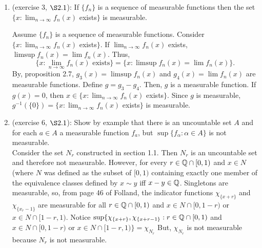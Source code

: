 \begin{enumerate}
\item (exercise 3, $\S 2.1$): If $\{f_n\}$ is a sequence of measurable functions then the set $\{x : \lim_{n \rightarrow \infty} f_n(x) $ exists$\}$ is measurable.
 \begin{pf}
Assume $\{f_n\}$ is a sequence of measurable functions. Consider $\{x : \lim_{n \rightarrow \infty} f_n(x) $ exists$\}$. If $\lim_{n \rightarrow \infty} f_n(x) $ exists, $\limsup f_n(x)=\lim f_n(x)$. Thus, \[
\{x : \lim_{n \rightarrow \infty} f_n(x) \text{ exists}\}= \{x : \limsup f_n(x)=\lim f_n(x)\}.
\]
By, proposition 2.7, $g_3(x)=\limsup f_n(x)$ and $g_4(x)=\lim f_n(x)$ are measurable functions. Define $g= g_3 - g_4$. Then, $g$ is a measurable function. If $g(x)=0$, then $x \in \{x : \lim_{n \rightarrow \infty} f_n(x) $ exists$\}$. Since $g$ is measurable, $g^{-1}(\{0\})=\{x : \lim_{n \rightarrow \infty} f_n(x) $ exists$\}$ is measurable. 
 \end{pf}
\item (exercise 6, $\S 2.1$): Show by example that there is an uncountable set $A$ and for each $a \in A$ a measurable function $f_a$, but $\sup \{f_\alpha : \alpha \in A\}$ is not measurable.  \\	
Consider the set $N_r$ constructed in section 1.1.  Then $N_r$ is an uncountable set and therefore not measurable. However, for every $r \in {\mathbb Q}\cap[0,1)$ and $x \in N$ (where $N$ was defined as the subset of $[0,1)$ containing exactly one member of the equivalence classes defined by $x \sim y$ iff $x-y \in {\mathbb Q}$. Singletons are measurable, so, from page 46 of Folland, the indicator functions $\chi_{\{x+r\}}$ and $\chi_{\{x_r-1\}}$ are measurable for all $r \in {\mathbb Q}\cap [0,1)$ and $x \in N\cap [0,1-r)$ or $x \in N\cap [1-r,1)$. Notice $\sup\{ \chi_{\{x+r\}}, \chi_{\{x+r-1\}}: r \in {\mathbb Q}\cap [0,1)$ and $x \in N\cap [0,1-r)$ or $x \in N\cap [1-r,1) \}=\chi_{N_r}$ But, $ \chi_{N_r}$ is not measurable because $N_r$ is not measurable. 
\end{enumerate}
